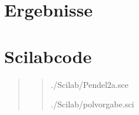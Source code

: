 \begin{quote}
\end{quote} %


\section{Ergebnisse}
\begin{quote}

    
    
\end{quote} %


\section{Scilabcode}
\begin{quote}
\begin{quote}
    
        {./Scilab/Pendel2a.sce}
    
        {./Scilab/polvorgabe.sci}

\end{quote}

	
\end{quote} %












